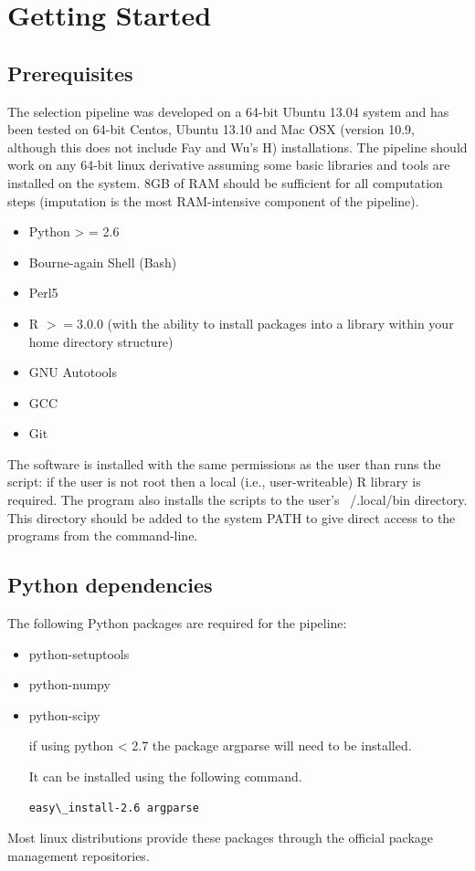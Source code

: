 \documentclass[a4paper,10pt]{article}
\begin{document}
\section{Getting Started}
\subsection{Prerequisites}
The selection pipeline was developed on a 64-bit Ubuntu 13.04 system
and has been tested on 64-bit Centos, Ubuntu 13.10 and Mac OSX (version 10.9, although this does not include Fay and Wu's H)
installations. The pipeline should work on any 64-bit linux derivative
assuming some basic libraries and tools are installed on the
system. 8GB of RAM should be sufficient for all computation steps
(imputation is the most RAM-intensive component of the pipeline).
\begin{itemize}
\item Python > = 2.6 
\item Bourne-again Shell (Bash)
\item Perl5
\item R \( >= 3.0.0 \) (with the ability to install packages into a
  library within your home directory structure)
\item GNU Autotools
\item GCC 
\item Git
\end{itemize}
The software is installed with the same permissions as the user than
runs the script: if the user is not root then a local (i.e.,
user-writeable) R library is
required. The program also installs the scripts to the user's
~/.local/bin directory.  This directory should be added to the system
PATH to give direct access to the programs from the command-line. 
 
\subsection{Python dependencies}
The following Python packages are required for the pipeline:
\begin{itemize}
\item python-setuptools
\item python-numpy
\item python-scipy

if using python < 2.7 the package argparse will need to be installed.

It can be installed using the following command.

\begin{verbatim}
easy\_install-2.6 argparse
\end{verbatim}
\end{itemize}
Most linux distributions provide these packages through the official
package management repositories.
\end{document}
